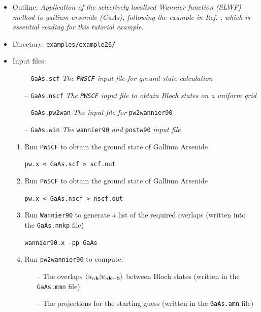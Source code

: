 \documentclass[a4paper,11pt,twoside]{article}
\begin{document}
\begin{itemize}

\item Outline: \textit{Application of the selectively localised Wannier function (SLWF) method to gallium arsenide (GaAs), following the example in Ref. \cite{Marianetti}, which is essential reading for this tutorial example.}


\item Directory: \verb|examples/example26/|


\item Input files:

\begin{itemize}

\item[--] \verb|GaAs.scf| \textit{The {\tt PWSCF} input file for ground state calculation}
\item[--] \verb|GaAs.nscf| \textit{The {\tt PWSCF} input file to obtain Bloch states on a uniform grid}
\item[--] \verb|GaAs.pw2wan| \textit{The input file for} \verb|pw2wannier90|
\item[--] \verb|GaAs.win| \textit{The} \verb|wannier90| \textit{and} \verb|postw90| \textit{input file}


\end{itemize}

\begin{enumerate}

\item Run {\tt PWSCF} to obtain the ground state of Gallium Arsenide

\verb|pw.x < GaAs.scf > scf.out|


\item Run {\tt PWSCF} to obtain the ground state of Gallium Arsenide

\verb|pw.x < GaAs.nscf > nscf.out|

\item Run {\tt Wannier90} to generate a list of the required overlaps (written into the \verb|GaAs.nnkp| file)

\verb|wannier90.x -pp GaAs|


\item Run {\tt pw2wannier90} to compute:

\begin{itemize}
\item[--] The overlaps $\langle u_{n\bf{k}}|u_{n\bf{k+b}}\rangle$ between  
Bloch states (written in the \verb|GaAs.mmn| file) 
\item[--] The projections for the starting guess (written in the \verb|GaAs.amn| file)


\end{itemize}
\end{enumerate}
\end{itemize}
\end{document}
